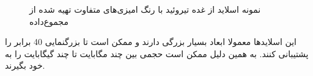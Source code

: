 \begin{figure}
\begin{center}
	\end{center}
	\caption[نمونه اسلاید اسکن‌شده از غده تیروئید با رنگ امیزی‌های متفاوت]{نمونه اسلاید از غده تیروئید با رنگ امیزی‌های متفاوت تهیه شده از مجموع‌داده \cite{papsocietyiamgeatlas} }
	\label{fig:samplecoloringfrompapsociety}
\end{figure}
این اسلاید‌ها معمولا ابعاد بسیار بزرگی دارند و ممکن است تا بزرگنمایی 40 برابر را پشتیبانی کنند.
به همین دلیل ممکن است حجمی بین چند مگابایت تا چند گیگابایت را به خود بگیرند.
